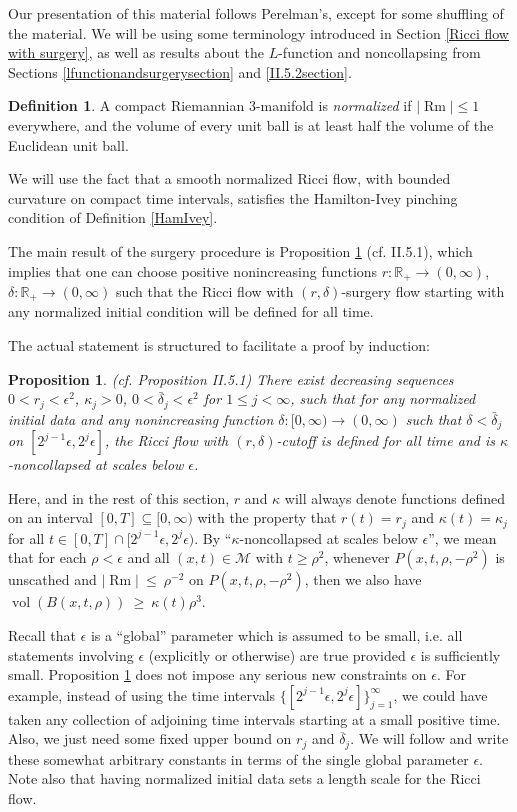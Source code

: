 \documentclass[12pt]{amsart}
\newcommand{\M}{{\mathcal M}}
\newcommand{\R}{{\mathbb R}}
\newcommand{\Rm}{\operatorname{Rm}}
\newcommand{\vol}{\operatorname{vol}}
\newcommand{\de}{\delta}
\newcommand{\eps}{\epsilon}
\newcommand{\ra}{\rightarrow}
\numberwithin{equation}{section}
\theoremstyle{plain}
\newtheorem{proposition}[equation]{Proposition}
\theoremstyle{definition}
\newtheorem{definition}[equation]{Definition}
\theoremstyle{remark}
\begin{document}
 Our presentation of this material follows Perelman's, except for
some shuffling of the material.  We will be using some terminology
introduced in Section \ref{Ricci flow with surgery}, as well
as results about the $L$-function and noncollapsing from 
Sections \ref{lfunctionandsurgerysection} and \ref{II.5.2section}.

\begin{definition}
A compact Riemannian $3$-manifold is {\em normalized} if
$|\Rm|\leq 1$ everywhere, and the volume of every unit 
ball is at least half the volume of the Euclidean unit
ball.  
\end{definition}

We will use the fact that a smooth normalized
Ricci flow, with bounded curvature on compact time intervals,
satisfies the Hamilton-Ivey pinching condition of
Definition \ref{HamIvey}.

The main result of the surgery procedure is Proposition \ref{surgeryflowexists}
(cf. II.5.1), which
implies that one can choose positive nonincreasing
functions $r:\R_+\ra (0,\infty)$,
$\de:\R_+\ra (0,\infty)$ such that the Ricci 
flow with $(r,\de)$-surgery
flow starting with any normalized initial condition will be defined 
for all time.  

The actual statement is structured to facilitate
a proof by induction:


\begin{proposition}(cf. Proposition II.5.1)
\label{surgeryflowexists}
There exist decreasing sequences $0<r_j<\eps^2$,
$\kappa_j>0$, $0<\bar\de_j<\eps^2$ for $1\leq j<\infty$,
such that for any normalized initial data and any nonincreasing function 
$\de:[0,\infty)\ra(0,\infty)$ such that $\de<\bar\de_j$
on $[2^{j-1}\eps,2^j\eps]$, the Ricci flow with $(r,\de)$-cutoff
is defined for all time and is $\kappa$-noncollapsed
at scales below $\eps$.  
\end{proposition}
\noindent
Here, and in the rest of this section, $r$ and $\kappa$
will always denote functions defined on an interval
$[0,T]\subseteq [0,\infty)$ with the property that 
$r(t)=r_j$ and $\kappa(t)=\kappa_j$
for all $t\in [0,T]\cap [2^{j-1}\eps,2^j\eps)$.
By ``$\kappa$-noncollapsed at scales below $\epsilon$'', we mean
that for each $\rho < \epsilon$ 
and all $(x, t) \in \M$ 
with $t \ge \rho^2$, 
whenever $P(x, t, \rho, - \rho^2)$ is unscathed and
$|\Rm| \: \le \: \rho^{-2}$ on $P(x, t, \rho, - \rho^2)$,
then we also have 
$\vol(B(x,t,\rho)) \: \ge \: \kappa(t) \rho^3$.

Recall that
$\eps$ is a ``global'' parameter which is assumed to be 
small, i.e. all statements involving $\eps$ (explicitly or
otherwise) are true provided $\eps$ is sufficiently small.
Proposition \ref{surgeryflowexists} does not impose any
serious new constraints on $\epsilon$.
For example, instead of using the time intervals
$\{[2^{j-1}\eps,2^j\eps]\}_{j=1}^\infty$,
we could have taken any collection of adjoining time intervals
starting at a small positive time. Also, we just need some
fixed upper bound on $r_j$ and $\overline{\delta}_j$.
We will follow \cite{Perelman2} and write these somewhat
arbitrary constants in terms of the single global parameter $\epsilon$.
Note also that having normalized initial data sets a length
scale for the Ricci flow.
\end{document}
